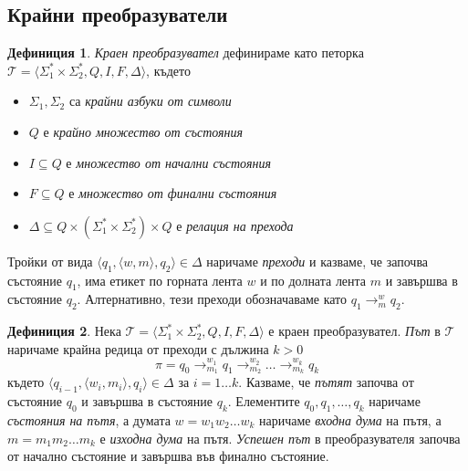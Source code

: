 \documentclass[12pt, oneside]{article}
\theoremstyle{definition}
\newtheorem{definition}{Дефиниция}[section]
\begin{document}
\subsection{Крайни преобразуватели}

\begin{definition}
	\emph{Краен преобразувател} дефинираме като петорка \( \mathcal{T} = \langle \Sigma_1^* \times \Sigma_2^*, Q, I, F, \Delta \rangle \), където

	\begin{itemize}
		\item \( \Sigma_1, \Sigma_2 \) са \emph{крайни азбуки от символи}
		\item \( Q \) е \emph{крайно множество от състояния}
		\item \( I \subseteq Q \) е \emph{множество от начални състояния}
		\item \( F \subseteq Q \) е \emph{множество от финални състояния}
		\item \( \Delta \subseteq Q \times (\Sigma_1^* \times \Sigma_2^*) \times Q \) е \emph{релация на прехода}
	\end{itemize}
 
	Тройки от вида \( \langle q_1, \langle w, m \rangle, q_2 \rangle \in \Delta \) наричаме \emph{преходи} и казваме, че започва състояние \( q_1 \), има етикет по горната лента \( w \) и по долната лента \( m \) и завършва в състояние \( q_2 \). Алтернативно, тези преходи обозначаваме като \( q_1 \to^w_m q_2 \).
\end{definition}

\begin{definition} 
	Нека \( \mathcal{T} = \langle \Sigma_1^* \times \Sigma_2^*, Q, I, F, \Delta \rangle \) е краен преобразувател. \emph{Път} в \( \mathcal{T} \) наричаме крайна редица от преходи с дължина \( k > 0 \) 
	\[ \pi = q_0 \to^{w_1}_{m_1} q_1 \to^{w_2}_{m_2} \ldots \to^{w_k}_{m_k}  q_k \] 
	където \( \langle q_{i-1}, \langle w_i, m_i \rangle, q_i \rangle \in \Delta \) за \( i = 1 \ldots k \). Казваме, че \emph{пътят} започва от състояние \( q_0 \) и завършва в състояние \( q_k \). Елементите \( q_0,q_1, \ldots ,q_k \) наричаме \emph{състояния на пътя}, а думата \( w = w_1 w_2 \ldots w_k \) наричаме \emph{входна дума} на пътя, а \( m = m_1 m_2 \ldots m_k \) е \emph{изходна дума} на пътя. \newline \emph{Успешен път} в преобразувателя започва от начално състояние и завършва във финално състояние.
\end{definition}
\end{document}
